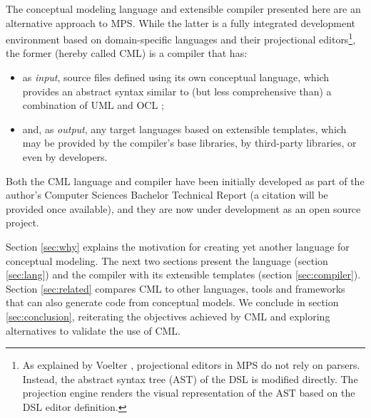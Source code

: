 The conceptual modeling language and extensible compiler presented here are an alternative approach to MPS.
While the latter is a fully integrated development environment based on domain-specific languages and their projectional editors\footnote{As explained by Voelter \cite{voelter}, projectional editors in MPS do not rely on parsers.
Instead, the abstract syntax tree (AST) of the DSL is modified directly.
The projection engine renders the visual representation of the AST based on the DSL editor definition.},
the former (hereby called CML) is a compiler that has:
\begin{itemize}
\item as \emph{input}, source files defined using its own conceptual language,
which provides an abstract syntax similar to (but less comprehensive than) a combination of UML \cite{uml} and OCL \cite{ocl}; 
\item and, as \emph{output}, any target languages based on extensible templates,
which may be provided by the compiler's base libraries, by third-party libraries, or even by developers.
\end{itemize}

Both the CML language and compiler have been initially developed as part of the author's Computer Sciences Bachelor Technical Report (a citation will be provided once available),
and they are now under development \cite{cml-repo} as an open source project.

Section \ref{sec:why} explains the motivation for creating yet another language for conceptual modeling.
The next two sections present the language (section \ref{sec:lang}) and the compiler with its extensible templates (section \ref{sec:compiler}).
Section \ref{sec:related} compares CML to other languages, tools and frameworks
that can also generate code from conceptual models.
We conclude in section \ref{sec:conclusion},
reiterating the objectives achieved by CML and exploring alternatives to validate the use of CML.

